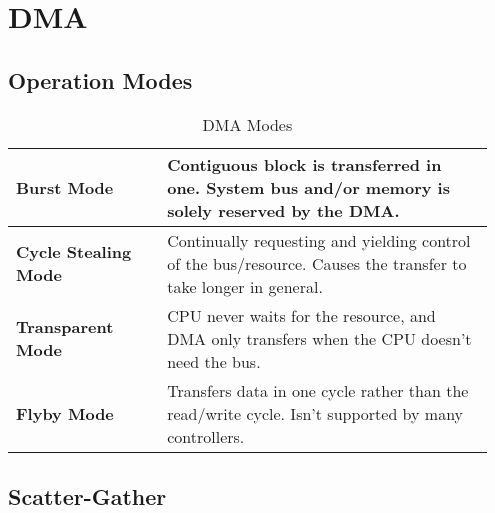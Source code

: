 \section{DMA }
	\subsection{Operation Modes}
		\begin{table}[H]
			\centering
			\begin{tabular}{|p{0.3\linewidth}|p{0.65\linewidth}|}
				\hline
				\textbf{Burst Mode}
					& Contiguous block is transferred in one. System bus and/or memory is solely reserved by the DMA.\\
				\hline
				\textbf{Cycle Stealing Mode}
					& Continually requesting and yielding control of the bus/resource. Causes the transfer to take longer in general.\\
				\hline
				\textbf{Transparent Mode}
					& CPU never waits for the resource, and DMA only transfers when the CPU doesn't need the bus.\\
				\hline	
				\textbf{Flyby Mode}
					& Transfers data in one cycle rather than the read/write cycle. Isn't supported by many controllers.\\
				\hline
			\end{tabular}
			\caption{DMA Modes}
		\end{table}	
		
	\subsection{Scatter-Gather}
